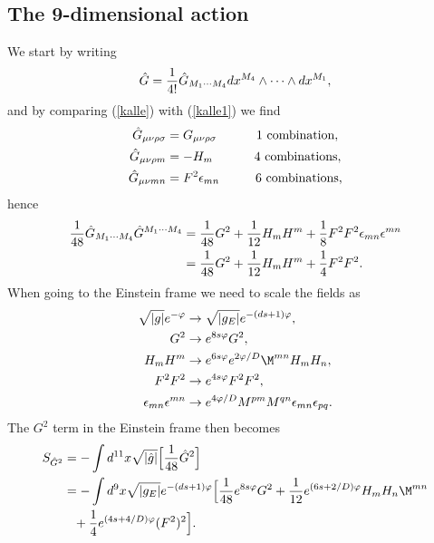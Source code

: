 \subsection{The 9-dimensional action}
We start by writing
\begin{equation}
\hat{G}={1 \over 4!}\hat{G}_{M_{1} \cdots M_{4}}dx^{M_{4}} \wedge \cdots \wedge dx^{M_{1}},
\label{kalle}
\end{equation}
and by comparing (\ref{kalle}) with (\ref{kalle1}) we find
\begin{align}
\hat{G}_{\mu \nu \rho \sigma}&=G_{\mu \nu \rho \sigma} \hspace{1.1cm} \mbox{1 combination}, \nonumber \\
\hat{G}_{\mu \nu \rho m}&=-H_m \hspace{1.15cm} \mbox{4 combinations}, \nonumber \\
\hat{G}_{\mu \nu mn}&=F^2 {\epsilon}_{mn} \hspace{1cm} \mbox{6 combinations},
\end{align}
hence
\begin{align}
{1 \over 48}\hat{G}_{M_{1} \cdots M_{4}} \hat{G}^{M_{1} \cdots M_{4}}&={1 \over 48}G^2 + {1 \over 12}H_m H^m + {1 \over 8}F^2 F^2 {\epsilon}_{mn} {\epsilon}^{mn} \nonumber \\
&= {1 \over 48}G^2 + {1 \over 12}H_m H^m + {1 \over 4}F^2 F^2.
\end{align}
When going to the Einstein frame we need to scale the fields as
\begin{align}
\sqrt{|g|} e^{-\varphi} &\rightarrow \sqrt{|g_E|}e^{-(ds+1)\varphi}, \nonumber \\
G^2 &\rightarrow e^{8s \varphi} G^2, \nonumber \\
H_m H^m &\rightarrow e^{6s\varphi}e^{2\varphi/D}\M^{mn}H_m H_n, \nonumber \\
F^2F^2 &\rightarrow e^{4s \varphi}F^2F^2, \nonumber \\
{\epsilon}_{mn} {\epsilon}^{mn} &\rightarrow e^{4\varphi/D} M^{pm} M^{qn} {\epsilon}_{mn} {\epsilon}_{pq}.
\label{ertyui}
\end{align}
The $G^2$ term in the Einstein frame then becomes
\begin{align}
S_{\hat G^2} &= - \int d^{11}x \sqrt{|\hat{g}|} \Big{[} \frac{1}{48} \hat G^2 \Big{]} \nonumber \\
& = - \int d^9x \sqrt{|g_E|}e^{-(ds+1)\varphi}\Big{[}\frac{1}{48}e^{8s\varphi}G^2+\frac{1}{12}e^{(6s+2/D)\varphi}H_mH_n\M^{mn} \nonumber \\
& \phantom{=}+ \frac{1}{4}e^{(4s+4/D)\varphi}(F^2)^2\Big{]}.
\end{align}
